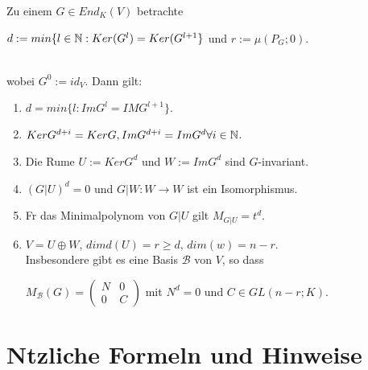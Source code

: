 \documentclass[11pt, a4paper]{article}
\begin{document}
\begin{lemma}
 Zu einem $G \in End_K(V) $ betrachte
\\ \centerline{$d := min \{ l \in \mathbb{N} : Ker (G^l) =Ker(G^{l + 1} \}$ und $r := \mu (P_G ; 0)$.}
\\wobei $G^0 := id_V$. Dann gilt:
\begin{enumerate}
\item $d =min \{l : Im G^l = IM G^{l + 1} \}.$
\item $Ker G^{d + i} = Ker G, Im G^{d + i} = Im G^d \forall i \in \mathbb{N}$.
\item Die R\aee ume $U := Ker G^d$ und $W := Im G^d$ sind $G$-invariant.
\item $(G|U)^d = 0$ und $G|W: W \rightarrow W$ ist ein Isomorphismus.
\item F\uee r das Minimalpolynom von $G|U$ gilt $M_{G|U} = t^d$.
\item $V = U \oplus W$, $dimd(U) = r \geq d$, $dim(w) = n - r$.
\\ Insbesondere gibt es eine Basis $\mathcal{B}$ von $V$, so dass
\\ \centerline{$M_\mathcal{B}(G) =
\left(\begin{array}{ll}{N} & {0} 
\\ {0} & {C}\end{array}\right) 
$
mit  $N^d = 0$ und $C \in GL (n-r; K)$.}
\end{enumerate}
\end{lemma}

\section{N\uee tzliche Formeln und Hinweise}
\end{document}
